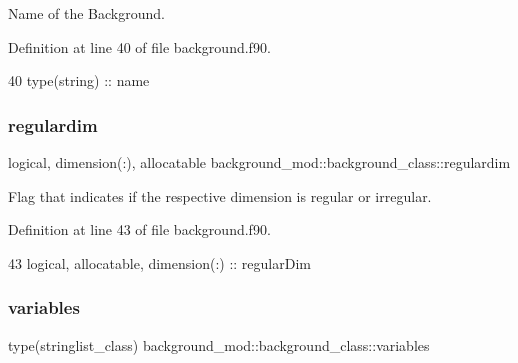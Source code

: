 Name of the Background. 



Definition at line 40 of file background.\+f90.


\begin{DoxyCode}
40         \textcolor{keywordtype}{type}(string) :: name
\end{DoxyCode}
\mbox{\label{structbackground__mod_1_1background__class_a78b62368ed110d33fd809e8ff101839b}} 
\subsubsection{\texorpdfstring{regulardim}{regulardim}}
{\footnotesize\ttfamily logical, dimension(\+:), allocatable background\+\_\+mod\+::background\+\_\+class\+::regulardim\hspace{0.3cm}{\ttfamily [private]}}



Flag that indicates if the respective dimension is regular or irregular. 



Definition at line 43 of file background.\+f90.


\begin{DoxyCode}
43         \textcolor{keywordtype}{logical}, \textcolor{keywordtype}{allocatable}, \textcolor{keywordtype}{dimension(:)} :: regularDim
\end{DoxyCode}
\mbox{\label{structbackground__mod_1_1background__class_af6524c71d9bc6c9b4226fe6e362f04fd}} 
\subsubsection{\texorpdfstring{variables}{variables}}
{\footnotesize\ttfamily type(stringlist\+\_\+class) background\+\_\+mod\+::background\+\_\+class\+::variables\hspace{0.3cm}{\ttfamily [private]}}



